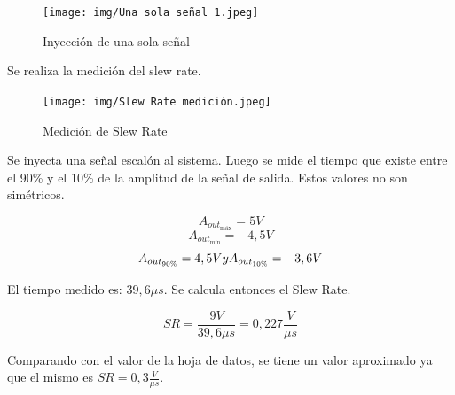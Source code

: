 \begin{figure}[H]
    \centering
    \texttt{[image: img/Una sola señal 1.jpeg]}
    \caption{Inyección de una sola señal}
    
\end{figure}

\newpage
\hspace{1mm} Se realiza la medición del slew rate.
\begin{figure}[H]
    \centering
    \texttt{[image: img/Slew Rate medición.jpeg]}
    \caption{Medición de Slew Rate}
    
\end{figure}

Se inyecta una señal escalón al sistema. Luego se mide el tiempo que existe entre el 90\% y el 10\% de la amplitud de la señal de salida. Estos valores no son simétricos.

\[A_{out_{\text{máx}}}= 5V\]
\[A_{out_{\text{mín}}} = -4,5V\] 
\[A_{out_{90\%}}= 4,5V \space y \space A_{out_{10\%}}= -3,6V\]

El tiempo medido es: \(39,6\mu s\). Se calcula entonces el Slew Rate.

\[SR= \frac{9V}{39,6\mu s}= 0,227\frac{V}{\mu s}\]

Comparando con el valor de la hoja de datos, se tiene un valor aproximado ya que el mismo es \(SR= 0,3 \frac{V}{\mu s}\).

